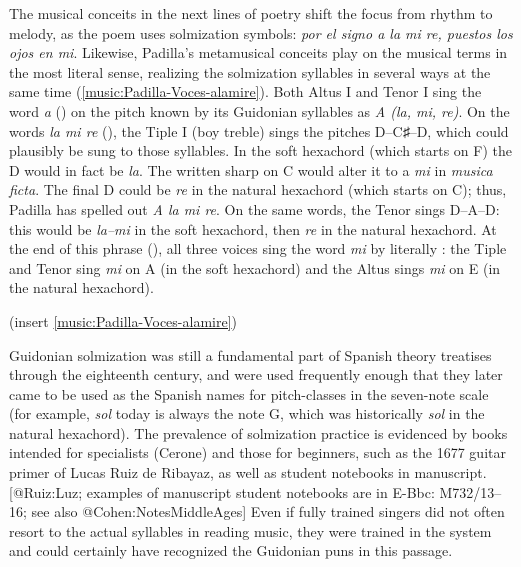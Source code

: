 The musical conceits in the next lines of poetry shift the focus from rhythm to
melody, as the poem uses solmization symbols: \emph{por el signo a la mi re, puestos
los ojos en mi}.
Likewise, Padilla's metamusical conceits play on the musical terms in the most
literal sense, realizing the solmization syllables in several ways at the same
time (\cref{music:Padilla-Voces-alamire}).
Both Altus I and Tenor I sing the word \emph{a} () on the pitch known by its
Guidonian syllables as \emph{A (la, mi, re)}.
On the words \emph{la mi re} (), the Tiple I (boy treble) sings the
pitches D--C♯--D, which could plausibly be sung to those syllables.
In the soft hexachord (which starts on F) the D would in fact be \emph{la}.
The written sharp on C would alter it to a \emph{mi} in \emph{musica ficta}. 
The final D could be \emph{re} in the natural hexachord (which starts on C); thus,
Padilla has spelled out \emph{A la mi re}.
On the same words, the Tenor sings D--A--D: this would be \emph{la--mi} in the soft
hexachord, then \emph{re} in the natural hexachord.
At the end of this phrase (), all three voices sing the word \emph{mi} by
literally : the Tiple and Tenor sing \emph{mi} on A (in
the soft hexachord) and the Altus sings \emph{mi} on E (in the natural hexachord).

(insert \cref{music:Padilla-Voces-alamire})
\label{music:Padilla-Voces-alamire}

Guidonian solmization was still a fundamental part of Spanish theory treatises
through the eighteenth century, and were used frequently enough that they later
came to be used as the Spanish names for pitch-classes in the seven-note scale
(for example, \emph{sol} today is always the note G, which was historically \emph{sol} in
the natural hexachord).
The prevalence of solmization practice is evidenced by books intended for
specialists (Cerone) and those for beginners, such as the 1677 guitar primer of
Lucas Ruiz de Ribayaz, as well as student notebooks in manuscript.
[@Ruiz:Luz; examples of manuscript student notebooks are in E-Bbc: M732/13--16;
see also @Cohen:NotesMiddleAges]
Even if fully trained singers did not often resort to the actual syllables in
reading music, they were trained in the system and could certainly have
recognized the Guidonian puns in this passage.

